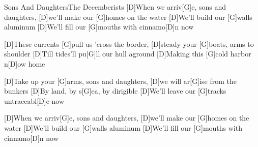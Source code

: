 \documentclass[../main.tex]{subfiles}
\begin{document}
\begin{songwithoutpagebreak}{Sons And Daughters}{The Decemberists}{}
[D]When we arriv[G]e, sons and daughters, [D]we'll make our [G]homes on the water
[D]We'll build our [G]walls aluminum 
[D]We'll fill our [G]mouths with cinnamo[D]n now

[D]These currents [G]pull us 'cross the border, [D]steady your [G]boats, arms to shoulder
[D]Till tides'll pu[G]ll our hull aground
[D]Making this [G]cold harbor n[D]ow home

[D]Take up your [G]arms, sons and daughters, [D]we will ar[G]ise from the bunkers
[D]By land, by s[G]ea, by dirigible
[D]We'll leave our [G]tracks untraceabl[D]e now

[D]When we arriv[G]e, sons and daughters, [D]we'll make our [G]homes on the water
[D]We'll build our [G]walls aluminum
[D]We'll fill our [G]mouths with cinnamo[D]n now
\end{songwithoutpagebreak}
\end{document}
